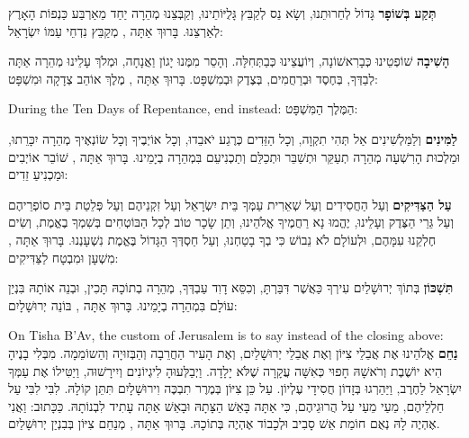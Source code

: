 \textbf{תְּקַע בְּשׁוֹפָר} גָּדוֹל לְחֵרוּתֵנוּ, וְשָׂא נֵס לְקַבֵּץ גָּלֻיּוֹתֵינוּ, וְקַבְּצֵנוּ מְהֵרָה יַחַד מֵאַרְבַּע כַּנְפוֹת הָאָרֶץ לְאַרְצֵנוּ. בָּרוּךְ אַתָּה \Shem{}, מְקַבֵּץ נִדְחֵי עַמּוֹ יִשְׂרָאֵל:

\textbf{הָשִׁיבָה} שׁוֹפְטֵינוּ כְּבָרִאשׁוֹנָה, וְיוֹעֲצֵינוּ כְּבַתְּחִלָּה. וְהָסֵר מִמֶּנוּ יָגוֹן וַאֲנָחָה, וּמְלֹךְ עָלֵינוּ מְהֵרָה אַתָּה \Shem{} לְבַדְּךָ, בְּחֶסֶד וּבְרַחֲמִים, בְּצֶדֶק וּבְמִשְׁפָּט. בָּרוּךְ אַתָּה \Shem{}, מֶלֶךְ אוֹהֵב צְדָקָה וּמִשְׁפָּט:

\begin{seasonal}{During the Ten Days of Repentance, end instead:}
הַמֶּלֶך הַמִּשְׁפָּט:
\end{seasonal}



\textbf{לַמִּינִים} וְלַמַּלְשִׁינִים אַל תְּהִי תִקְוָה, וְכָל הַזֵּדִים כְּרֶגַע יֹאבֵדוּ, וְכָל אוֹיְבֶיךָ וְכָל שׂוֹנְאֶיךָ מְהֵרָה יִכָּרֵתוּ, וּמַלְכוּת הָרִשְׁעָה מְהֵרָה תְעַקֵּר וּתְשַׁבֵּר וּתְכַלֵּם וְתַכְנִיעֵם בִּמְהֵרָה בְיָמֵינוּ. בָּרוּךְ אַתָּה \Shem{}, שׁוֹבֵר אוֹיְבִים וּמַכְנִיעַ זֵדִים:

\textbf{עַל הַצַּדִּיקִים} וְעַל הַחֲסִידִים וְעַל שְׁאֵרִית עַמְּךָ בֵּית יִשְׂרָאֵל וְעַל זִקְנֵיהֶם וְעַל פְּלֵטַת בֵּית סוֹפְרֵיהֶם וְעַל גֵּרֵי הַצֶּדֶק וְעָלֵינוּ, יֶהֱמוּ נָא רַחֲמֶיךָ \Shem{} אֱלֹהֵינוּ, וְתֵן שָׂכָר טוֹב לְכָל הַבּוֹטְחִים בְּשִׁמְךָ בֶאֱמֶת, וְשִׂים חֶלְקֵנוּ עִמָּהֶם, וּלְעוֹלָם לֹא נֵבוֹשׁ כִּי בְךָ בָטַחְנוּ, וְעַל חַסְדְּךָ הַגָּדוֹל בֶּאֱמֶת נִשְׁעָנְנוּ. בָּרוּךְ אַתָּה \Shem{}, מִשְׁעָן וּמִבְטָח לַצַּדִּיקִים:

\textbf{תִּשְׁכּוֹן} בְּתוֹךְ יְרוּשָׁלַיִם עִירְךָ כַּאֲשֶׁר דִּבַּרְתָּ, וְכִסֵּא דָוִד עַבְדְּךָ, מְהֵרָה בְתוֹכָהּ תָּכִין, וּבְנֵה אוֹתָהּ בִּנְיַן עוֹלָם בִּמְהֵרָה בְיָמֵינוּ. בָּרוּךְ אַתָּה \Shem{}, בּוֹנֵה יְרוּשָׁלָיִם:

\begin{seasonal}{On Tisha B'Av, the custom of Jerusalem is to say instead of the closing above:}
\textbf{נַחֵם} \Shem{} אֱלֹהֵינוּ אֶת אֲבֵלֵי צִיּוֹן וְאֶת אֲבֵלֵי יְרוּשָׁלַיִם, וְאֶת הָעִיר הַחֲרֵבָה וְהַבְּזוּיָה וְהַשוֹמֵמָה. מִבְּלִי בָנֶיהָ הִיא יוֹשֶׁבֶת וְרֹאשָׁהּ חָפוּי כְּאִשָּׁה עֲקָרָה שֶׁלֹּא יָלָדָה. וַיְבַלְּעוּהָ לִיגְיוֹנִים וְיִירָשׁוּה, וַיַטִּילוֹ אֶת עַמְּךָ יִשְׂרָאֵל לַחֶרֶב, וַיַּהַרְגוּ בְּזָדוֹן חֲסִידָי עֶלְיוֹן. עַל כֵּן צִיּוֹן בְּמֶרֶר תִבְכֶּה וִירוּשָׁלָיִם תִּתֵּן קוֹלָהּ. לִבִּי לִבִּי עַל חַלְלֵיהֶם, מֵעַי מֵעַי עַל הֲרוּגֵיהֶם, כִּי אַתָּה \Shem{} בָּאֵשׁ הַצָּתָהּ וּבָאֵשׁ אַתָּה עָתִיד לִבְנוֹתָהּ. כַּכָּתוּב: וַאֲנִי אֶהְיֶה לָהּ נְאֻם \Shem{} חוֹמַת אֵשׁ סָבִיב וּלְכָבוֹד אֶהְיֶה בְּתוֹכָהּ. בָּרוּךְ אַתָּה \Shem{}, מְנַחֵם צִיּוֹן בְּבִנְיַן יְרוּשָׁלַיִם.
\end{seasonal}

